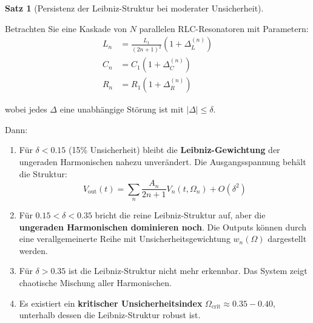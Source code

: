 \documentclass[a4paper,12pt,twoside]{report}
\theoremstyle{definition}
\newtheorem{satz}{Satz}
\begin{document}
\begin{satz}[Persistenz der Leibniz-Struktur bei moderater Unsicherheit]
\label{satz:leibniz_unsicherheit}

Betrachten Sie eine Kaskade von $N$ parallelen RLC-Resonatoren mit Parametern:
\begin{align}
L_n &= \frac{L_1}{(2n+1)^2} (1 + \Delta_L^{(n)}) \\
C_n &= C_1 (1 + \Delta_C^{(n)}) \\
R_n &= R_1 (1 + \Delta_R^{(n)})
\end{align}

wobei jedes $\Delta$ eine unabhängige Störung ist mit $|\Delta| \leq \delta$.

Dann:

\begin{enumerate}
    \item Für $\delta < 0.15$ (15\% Unsicherheit) bleibt die \textbf{Leibniz-Gewichtung} der ungeraden Harmonischen nahezu unverändert. Die Ausgangsspannung behält die Struktur:
    \begin{equation}
    V_{\text{out}}(t) = \sum_n \frac{A_n}{2n+1} V_n(t, \Omega_n) + O(\delta^2)
    \end{equation}
    
    \item Für $0.15 < \delta < 0.35$ bricht die reine Leibniz-Struktur auf, aber die \textbf{ungeraden Harmonischen dominieren noch}. Die Outputs können durch eine verallgemeinerte Reihe mit Unsicherheitsgewichtung $w_n(\Omega)$ dargestellt werden.
    
    \item Für $\delta > 0.35$ ist die Leibniz-Struktur nicht mehr erkennbar. Das System zeigt chaotische Mischung aller Harmonischen.
    
    \item Es existiert ein \textbf{kritischer Unsicherheitsindex} $\Omega_{\text{crit}} \approx 0.35-0.40$, unterhalb dessen die Leibniz-Struktur robust ist.
\end{enumerate}

\end{satz}
\end{document}

